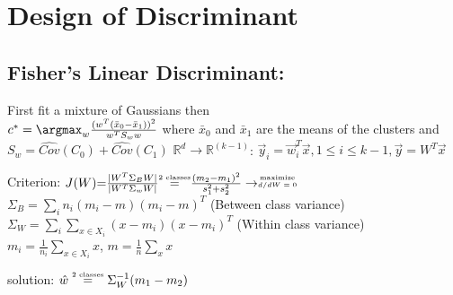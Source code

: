 \section{Design of Discriminant}


\subsection*{Fisher's Linear Discriminant:} 
First fit a mixture of Gaussians then \\ \(c^{*} = \argmax_w \frac{(w^T(\bar{x}_0 -\bar{x}_1))^2}{w^TS_ww}\) where \(\bar{x}_0\) and \(\bar{x}_1\) are the means of the clusters and \(S_w=\hat{Cov}(C_0) + \hat{Cov}(C_1)\) 
$\mathbb{R}^d \rightarrow \mathbb{R}^{(k-1)}$: 
$\vec{y}_i = \vec{w}_i^T\vec{x}, 1 \leq i \leq k - 1, \vec{y} = W^T\vec{x}$

{\footnotesize Criterion:} $J(W) {=} \frac{|W^T\Sigma_B W|}{|W^T\Sigma_w W|} {\stackrel{\text{\tiny 2 classes}}{=}} \frac{(m_2 - m_1)^2}{s_1^2 + s_2^2}
\rightarrow \stackrel{\text{\tiny maximize}}{\text{\tiny $d/dW = 0$}}$ \\
$\Sigma_B = \sum_i n_i (m_i-m)(m_i-m)^T$ {\tiny(Between class variance)} \\
$\Sigma_W = \sum_i \sum_{x \in X_i} (x - m_i)(x - m_i)^T$ 
{\tiny(Within class variance)} \\
$m_i = \frac{1}{n_i} \sum_{x \in X_i} x$, $m = \frac{1}{n}\sum_x x$	

solution: $\hat{w} \stackrel{\text{\tiny 2 classes}} {=} \Sigma_W^{-1} (m_1 - m_2)$